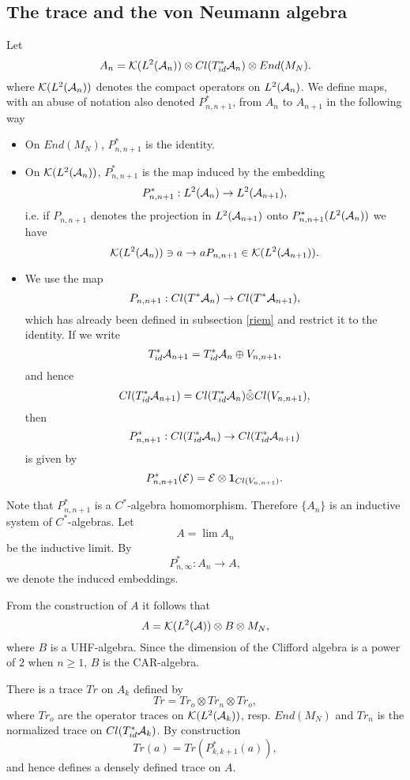 \documentclass[12pt]{article}
\def\ca{{\cal A}}
\def\ce{{\cal E}}
\def\ch{{\cal H}}
\def\ck{{\cal K}}
\begin{document}
{\subsection{The trace and the von Neumann algebra} \label{von}
Let
$$A_n=\ck(L^2(\ca_{n}))\otimes Cl(T^*_{id}\ca_{n})\otimes End(M_N).$$
where $\ck(L^2(\ca_{n}))$ denotes the compact operators on $L^2(\ca_{n})$. %
We define maps, with an abuse of notation also denoted $P^*_{n,n+1}$, from $A_n$ to $A_{n+1}$ in the following way
\begin{itemize}
\item On $End(M_N)$, $P_{n,n+1}^*$ is the identity.
\item On $\ck (L^2(\ca_{n}))$, $P_{n,n+1}^*$ is the map induced by the embedding $$P_{n,n+1}^*:L^2 (\ca_{n})\to L^2(\ca_{n+1}),$$
i.e. if $P_{n,n+1}$ denotes the projection in $L^2(\ca_{n+1})$ onto $P_{n,n+1}^*(L^2(\ca_{n}))$ we have
$$\ck (L^2(\ca_{n}))\ni a\to aP_{n,n+1}\in \ck (L^2(\ca_{n+1})).$$
\item We  use the map 
$$P_{n,n+1}:Cl(T^*\ca_n) \to Cl(T^*\ca_{n+1}),$$
which has already been defined in subsection \ref{riem} and restrict it to the identity. If we write 
$$T^*_{id}\ca_{n+1}=T^*_{id}\ca_{n}\oplus V_{n,n+1},$$
and hence  
$$Cl(T^*_{id}\ca_{n+1})=Cl(T^*_{id}\ca_{n})\hat{\otimes} Cl( V_{n,n+1}),$$
then $$P^*_{n,n+1}:Cl(T^*_{id}\ca_{n})\to Cl(T^*_{id}\ca_{n+1})$$ 
is given by
$$P^*_{n,n+1}(\ce)=\ce\otimes \mathbf{1}_{Cl( V_{n,n+1})}.$$
\end{itemize}
Note that $P^*_{n,n+1}$ is a $C^*$-algebra homomorphism. Therefore $\{ A_n\}$ is an inductive system of $C^*$-algebras. Let 
$$A=\lim A_n$$ 
be the inductive limit.  By 
$$P^*_{n,\infty} :A_n \to A,$$
we denote the induced embeddings.  

From the construction of $A$ it follows that 
\begin{equation}\label{faktor}
A=\ck(L^2(\ca))\otimes B \otimes M_N,
 \end{equation}
 where $B$ is a UHF-algebra.  Since the dimension of the Clifford algebra is a power of $2$ when $n\geq1 $, $B$ is  the CAR-algebra.

There is a trace $Tr$ on $A_k$ defined by
$$Tr=Tr_o\otimes Tr_n \otimes Tr_o,$$
where $Tr_o$ are the operator traces on $\ck(L^2(\ca_{k}))$, resp. $ End(M_N)$ and $Tr_n$ is the normalized trace on $ Cl(T^*_{id}\ca_{k})$. By construction  
$$Tr ( a )=Tr(P^*_{k,k+1}(a )),$$ and hence defines a densely defined trace on $A$.

}
\end{document}
